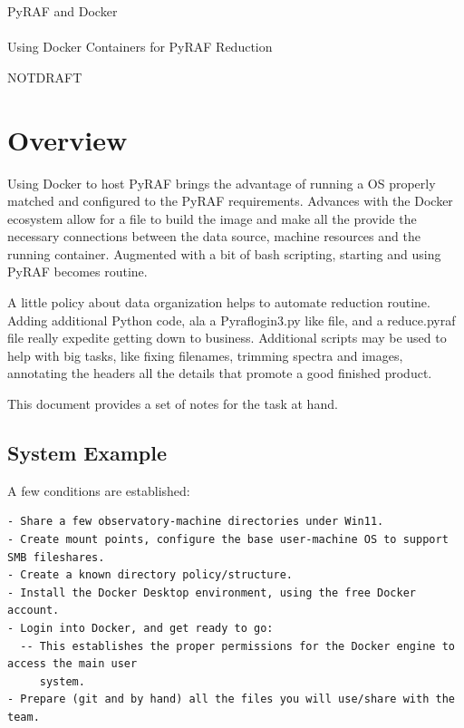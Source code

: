 \documentclass[letter,11pt,oneside]{article}
\def\documentisdraft{NOTDRAFT}
\newcommand{\dhl}[1]{{\color{verbcolor}{\texttt#1}}}
\begin{document}

\vskip 1.5cm


\begin{center}
 {\Huge PyRAF and Docker \\
~ \\
 {\Large Using Docker Containers for PyRAF Reduction} }
\end{center}

\vskip 2.5cm




\setcounter{section}{0}

\ifx\documentisdraft\drafttest
\linenumbers    %
\fi

\section{Overview}

Using Docker to host PyRAF brings the advantage of running a OS properly
matched and configured to the PyRAF requirements. Advances with the Docker
ecosystem allow for a \dhl{docker-compose.yml} file to build the image
and make all the provide the necessary connections between the data source,
machine resources and the running container. Augmented with a bit of bash
scripting, starting and using PyRAF becomes routine.

A little policy about data organization helps to automate reduction routine.
Adding additional Python code, ala a Pyraflogin3.py like file, and a reduce.pyraf
file really expedite getting down to business. Additional scripts may be used
to help with big tasks, like fixing filenames, trimming spectra and images, annotating
the headers all the details that promote a good finished product.

This document provides a set of notes for the task at hand.

\subsection{System Example}

A few conditions are established:

\begingroup \fontsize{10pt}{10pt}
\selectfont
\begin{verbatim} 
- Share a few observatory-machine directories under Win11.
- Create mount points, configure the base user-machine OS to support SMB fileshares.
- Create a known directory policy/structure.
- Install the Docker Desktop environment, using the free Docker account.
- Login into Docker, and get ready to go:
  -- This establishes the proper permissions for the Docker engine to access the main user
     system.
- Prepare (git and by hand) all the files you will use/share with the team.
\end{verbatim}
\endgroup
\end{document}
